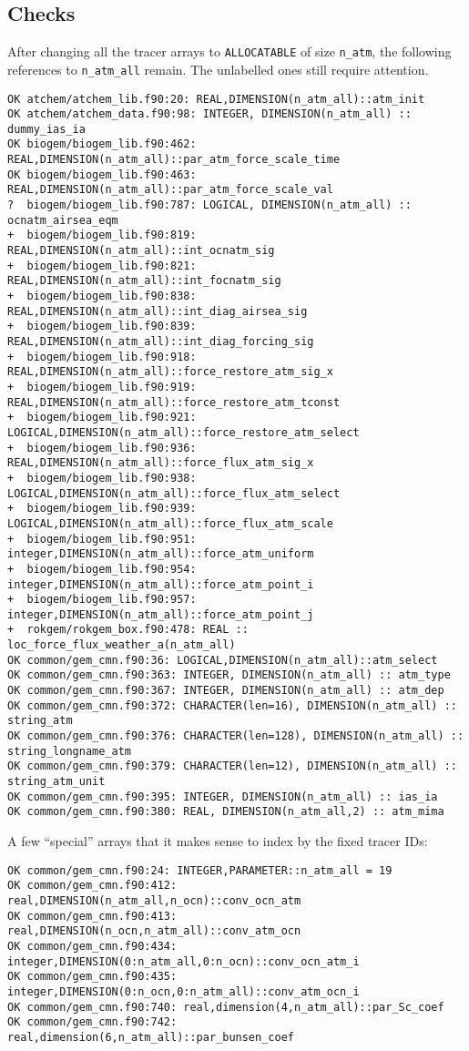 \documentclass[a4paper,10pt,article]{memoir}
\begin{document}
\subsection{Checks}

After changing all the tracer arrays to \texttt{ALLOCATABLE} of size
\texttt{n\_atm}, the following references to \texttt{n\_atm\_all}
remain.  The unlabelled ones still require attention.

\begin{verbatim}
OK atchem/atchem_lib.f90:20: REAL,DIMENSION(n_atm_all)::atm_init
OK atchem/atchem_data.f90:98: INTEGER, DIMENSION(n_atm_all) :: dummy_ias_ia
OK biogem/biogem_lib.f90:462: REAL,DIMENSION(n_atm_all)::par_atm_force_scale_time
OK biogem/biogem_lib.f90:463: REAL,DIMENSION(n_atm_all)::par_atm_force_scale_val
?  biogem/biogem_lib.f90:787: LOGICAL, DIMENSION(n_atm_all) :: ocnatm_airsea_eqm
+  biogem/biogem_lib.f90:819: REAL,DIMENSION(n_atm_all)::int_ocnatm_sig
+  biogem/biogem_lib.f90:821: REAL,DIMENSION(n_atm_all)::int_focnatm_sig
+  biogem/biogem_lib.f90:838: REAL,DIMENSION(n_atm_all)::int_diag_airsea_sig
+  biogem/biogem_lib.f90:839: REAL,DIMENSION(n_atm_all)::int_diag_forcing_sig
+  biogem/biogem_lib.f90:918: REAL,DIMENSION(n_atm_all)::force_restore_atm_sig_x
+  biogem/biogem_lib.f90:919: REAL,DIMENSION(n_atm_all)::force_restore_atm_tconst
+  biogem/biogem_lib.f90:921: LOGICAL,DIMENSION(n_atm_all)::force_restore_atm_select
+  biogem/biogem_lib.f90:936: REAL,DIMENSION(n_atm_all)::force_flux_atm_sig_x
+  biogem/biogem_lib.f90:938: LOGICAL,DIMENSION(n_atm_all)::force_flux_atm_select
+  biogem/biogem_lib.f90:939: LOGICAL,DIMENSION(n_atm_all)::force_flux_atm_scale
+  biogem/biogem_lib.f90:951: integer,DIMENSION(n_atm_all)::force_atm_uniform
+  biogem/biogem_lib.f90:954: integer,DIMENSION(n_atm_all)::force_atm_point_i
+  biogem/biogem_lib.f90:957: integer,DIMENSION(n_atm_all)::force_atm_point_j
+  rokgem/rokgem_box.f90:478: REAL :: loc_force_flux_weather_a(n_atm_all)
OK common/gem_cmn.f90:36: LOGICAL,DIMENSION(n_atm_all)::atm_select
OK common/gem_cmn.f90:363: INTEGER, DIMENSION(n_atm_all) :: atm_type
OK common/gem_cmn.f90:367: INTEGER, DIMENSION(n_atm_all) :: atm_dep
OK common/gem_cmn.f90:372: CHARACTER(len=16), DIMENSION(n_atm_all) :: string_atm
OK common/gem_cmn.f90:376: CHARACTER(len=128), DIMENSION(n_atm_all) :: string_longname_atm
OK common/gem_cmn.f90:379: CHARACTER(len=12), DIMENSION(n_atm_all) :: string_atm_unit
OK common/gem_cmn.f90:395: INTEGER, DIMENSION(n_atm_all) :: ias_ia
OK common/gem_cmn.f90:380: REAL, DIMENSION(n_atm_all,2) :: atm_mima
\end{verbatim}
A few ``special'' arrays that it makes sense to index by the fixed
tracer IDs:
\begin{verbatim}
OK common/gem_cmn.f90:24: INTEGER,PARAMETER::n_atm_all = 19
OK common/gem_cmn.f90:412: real,DIMENSION(n_atm_all,n_ocn)::conv_ocn_atm
OK common/gem_cmn.f90:413: real,DIMENSION(n_ocn,n_atm_all)::conv_atm_ocn
OK common/gem_cmn.f90:434: integer,DIMENSION(0:n_atm_all,0:n_ocn)::conv_ocn_atm_i
OK common/gem_cmn.f90:435: integer,DIMENSION(0:n_ocn,0:n_atm_all)::conv_atm_ocn_i
OK common/gem_cmn.f90:740: real,dimension(4,n_atm_all)::par_Sc_coef
OK common/gem_cmn.f90:742: real,dimension(6,n_atm_all)::par_bunsen_coef
\end{verbatim}
\end{document}
